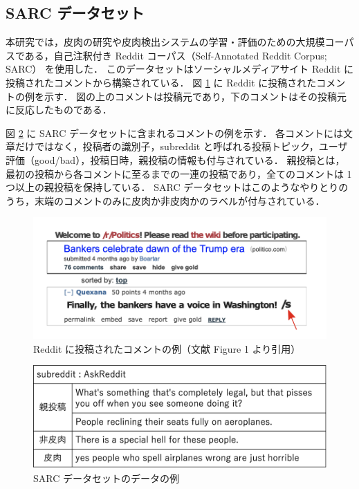 

\subsection{SARC データセット}
本研究では，皮肉の研究や皮肉検出システムの学習・評価のための大規模コーパスである，自己注釈付き Reddit コーパス（Self-Annotated Reddit Corpus; SARC）\cite{khodak2018} を使用した．
このデータセットはソーシャルメディアサイト Reddit に投稿されたコメントから構築されている．
図 \ref{fig:reddit_sample} に Reddit に投稿されたコメントの例を示す．
図の上のコメントは投稿元であり，下のコメントはその投稿元に反応したものである．
\par
図 \ref{fig:30_dataset_sample} に SARC データセットに含まれるコメントの例を示す．
各コメントには文章だけではなく，投稿者の識別子，subreddit と呼ばれる投稿トピック，ユーザ評価（good/bad），投稿日時，親投稿の情報も付与されている．
親投稿とは，最初の投稿から各コメントに至るまでの一連の投稿であり，全てのコメントは 1 つ以上の親投稿を保持している．
SARC データセットはこのようなやりとりのうち，末端のコメントのみに皮肉か非皮肉かのラベルが付与されている．
\par

\begin{figure}[b]
 	\begin{center}
		\includegraphics[width=0.8\linewidth]{./figure/30_reddit.png}
		\caption{Reddit に投稿されたコメントの例（文献 \cite{khodak2018} Figure 1 より引用）}
		\label{fig:reddit_sample}
	\end{center}
\end{figure}

\begin{figure}[tb]
 	\begin{center}
		\includegraphics[width=0.8\linewidth]{./figure/30_dataset_sample.png}
		\caption{SARC データセットのデータの例}
		\label{fig:30_dataset_sample}
	\end{center}
\end{figure}

